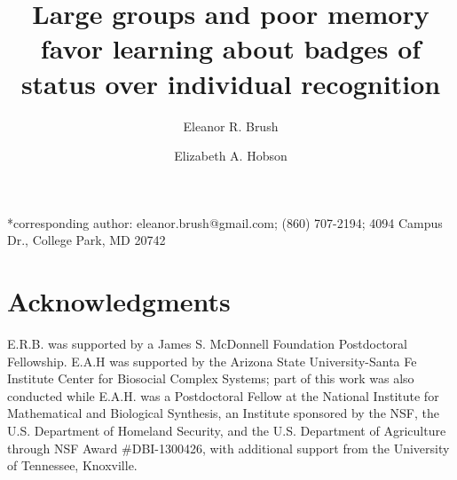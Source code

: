 

\noindent
\title{Large groups and poor memory favor learning about badges of status over individual recognition} 
\author[1,*]{Eleanor R. Brush}

\author[2]{Elizabeth A. Hobson}
\date{} 
\maketitle

*corresponding author: eleanor.brush@gmail.com; (860) 707-2194; 4094 Campus Dr., College Park, MD 20742

\newpage


\section*{Acknowledgments}
E.R.B. was supported by a James S. McDonnell Foundation Postdoctoral Fellowship. E.A.H was supported by the Arizona State University-Santa Fe Institute Center for Biosocial Complex Systems; part of this work was also conducted while E.A.H. was a Postdoctoral Fellow at the National Institute for Mathematical and Biological Synthesis, an Institute sponsored by the NSF, the U.S. Department of Homeland Security, and the U.S. Department of Agriculture through NSF Award \#DBI-1300426, with additional support from the University of Tennessee, Knoxville.

